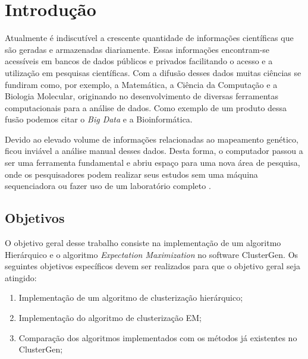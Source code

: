 \chapter{Introdução}
Atualmente é indiscutível a crescente quantidade de informações científicas que são geradas e armazenadas diariamente. Essas informações encontram-se acessíveis em bancos de dados públicos e privados facilitando o acesso e a utilização em pesquisas científicas. Com a difusão desses dados muitas ciências se fundiram como, por exemplo, a Matemática, a Ciência da Computação e a Biologia Molecular, originando no desenvolvimento de diversas ferramentas computacionais para a análise de dados. Como exemplo de um produto dessa fusão podemos citar o \textit{Big Data} e a Bioinformática.

Devido ao elevado volume de informações relacionadas ao mapeamento genético, ficou inviável a análise manual desses dados. Desta forma, o computador passou a ser uma ferramenta fundamental e abriu espaço para uma nova área de pesquisa, onde os pesquisadores podem realizar seus estudos sem uma máquina sequenciadora ou fazer uso de um laboratório completo \cite{bergeron2003bioinformatics}.

\section{Objetivos}
O objetivo geral desse trabalho consiste na implementação de um algoritmo Hierárquico e o algoritmo \textit{Expectation Maximization} no software ClusterGen. Os seguintes objetivos específicos devem ser realizados para que o objetivo geral seja atingido:
\begin{enumerate}
\item Implementação de um algoritmo 
de clusterização hierárquico;
\item Implementação do algoritmo de  clusterização EM;
\item Comparação dos algoritmos implementados com os métodos já existentes no ClusterGen;
\end{enumerate}
